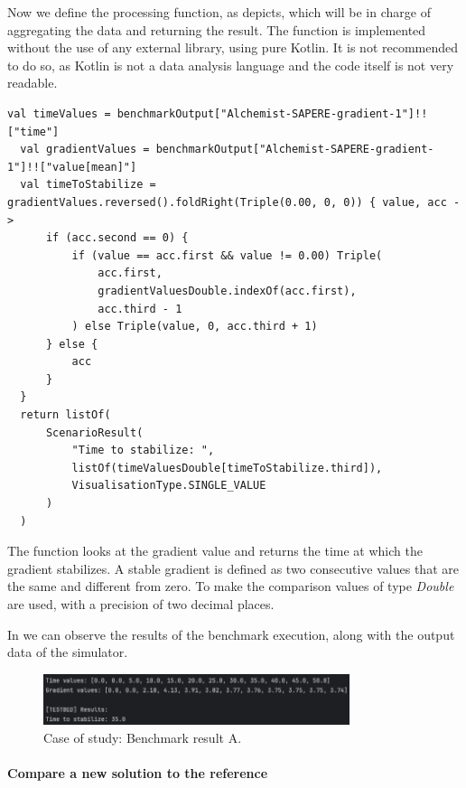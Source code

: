 \documentclass[12pt,a4paper,openright,twoside]{book}
\begin{document}
Now we define the processing function, as  depicts, which will be in charge of aggregating the data and returning the result.
The function is implemented without the use of any external library, using pure Kotlin.
It is not recommended to do so, as Kotlin is not a data analysis language and the code itself is not very readable.

\begin{lstlisting}[style=my-kotlin, language=my-kotlin, label={lst:cos-postproc}, caption={Case of study: output processing function.}]
  val timeValues = benchmarkOutput["Alchemist-SAPERE-gradient-1"]!!["time"]
  val gradientValues = benchmarkOutput["Alchemist-SAPERE-gradient-1"]!!["value[mean]"]
  val timeToStabilize = gradientValues.reversed().foldRight(Triple(0.00, 0, 0)) { value, acc ->
      if (acc.second == 0) {
          if (value == acc.first && value != 0.00) Triple(
              acc.first,
              gradientValuesDouble.indexOf(acc.first),
              acc.third - 1
          ) else Triple(value, 0, acc.third + 1)
      } else {
          acc
      }
  }
  return listOf(
      ScenarioResult(
          "Time to stabilize: ",
          listOf(timeValuesDouble[timeToStabilize.third]),
          VisualisationType.SINGLE_VALUE
      )
  )
\end{lstlisting}

The function looks at the gradient value and returns the time at which the gradient stabilizes.
A stable gradient is defined as two consecutive values that are the same and different from zero.
To make the comparison values of type \textit{Double} are used, with a precision of two decimal places.

In  we can observe the results of the benchmark execution, along with the output data of the simulator.

\begin{figure}[h!]
  \centering
  \includegraphics[width=0.8\textwidth]{figures/result-A.png}
  \caption{Case of study: Benchmark result A.}
  \label{fig:result-A}
\end{figure}

\paragraph*{Compare a new solution to the reference}
\end{document}
